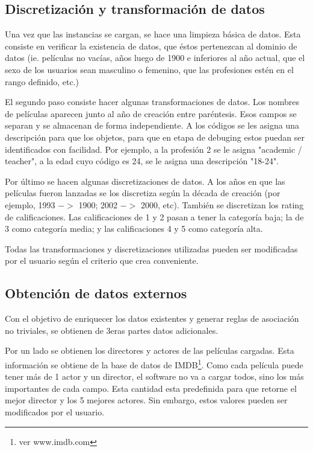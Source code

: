 \documentclass[journal]{IEEEtran}
\begin{document}
\subsection{Discretización y transformación de datos}
Una vez que las instancias se cargan, se hace una limpieza básica de datos.
Esta consiste en verificar la existencia de datos, que éstos pertenezcan
al dominio de datos (ie. películas no vacías, años luego de 1900 e inferiores
al año actual, que el sexo de los usuarios sean masculino o femenino, que las
profesiones estén en el rango definido, etc.)

El segundo paso consiste hacer algunas transformaciones de datos. Los nombres
de películas aparecen junto al año de creación entre paréntesis. Esos campos se 
separan y se almacenan de forma independiente. A los códigos se les
asigna una descripción para que los objetos, para que en etapa de debuging estos
puedan ser identificados con facilidad. Por ejemplo, a la profesión 2 se 
le asigna "academic / teacher", a la edad cuyo código es 24, se le asigna
una descripción "18-24".

Por último se hacen algunas discretizaciones de datos. A los años en que
las películas fueron lanzadas se los discretiza según la década de creación
 (por ejemplo, 1993 $-$$>$ 1900; 2002 $-$$>$ 2000, etc). 
También se discretizan los rating de calificaciones. Las calificaciones de
1 y 2 pasan a tener la categoría baja; la de 3 como categoría media; y las
calificaciones 4 y 5 como categoría alta. 

Todas las transformaciones y discretizaciones utilizadas pueden ser modificadas
por el usuario según el criterio que crea conveniente. 



\subsection{Obtención de datos externos}
Con el objetivo de enriquecer los datos existentes y generar reglas de asociación
no triviales, se obtienen de 3eras partes datos adicionales.

Por un lado se obtienen los directores y actores de las películas cargadas. Esta información se
obtiene de la base de datos de IMDB\footnote{ver www.imdb.com}. Como cada película puede
tener más de 1 actor y un director, el software no va a cargar todos, sino los más importantes
de cada campo. Esta cantidad esta predefinida para que retorne el mejor director y los 
5 mejores actores. Sin embargo, estos valores pueden ser modificados por el usuario.
\end{document}
